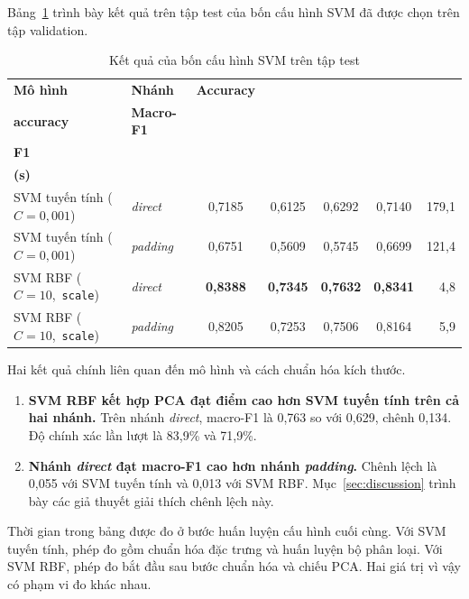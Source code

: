 Bảng~\ref{tab:svm_test} trình bày kết quả trên tập test của bốn cấu hình SVM đã được chọn trên tập validation.

\begin{table}[H]
\centering
\caption{Kết quả của bốn cấu hình SVM trên tập test}
\label{tab:svm_test}
\small
\setlength{\tabcolsep}{4pt}
\begin{tabularx}{\linewidth}{@{}Xlccccr@{}}
\toprule
\textbf{Mô hình} & \textbf{Nhánh} & \textbf{Accuracy} &
\shortstack{\textbf{Balanced}\\\textbf{accuracy}} & \textbf{Macro-F1} &
\shortstack{\textbf{Weighted}\\\textbf{F1}} & \shortstack{\textbf{Thời gian}\\\textbf{(s)}} \\
\midrule
SVM tuyến tính \mbox{($C = 0{,}001$)} & \emph{direct}  & 0,7185 & 0,6125 & 0,6292 & 0,7140 & 179,1 \\
SVM tuyến tính \mbox{($C = 0{,}001$)} & \emph{padding} & 0,6751 & 0,5609 & 0,5745 & 0,6699 & 121,4 \\
SVM RBF \mbox{($C = 10$, \texttt{scale})} & \emph{direct}  & \textbf{0,8388} & \textbf{0,7345} & \textbf{0,7632} & \textbf{0,8341} & 4,8 \\
SVM RBF \mbox{($C = 10$, \texttt{scale})} & \emph{padding} & 0,8205 & 0,7253 & 0,7506 & 0,8164 & 5,9 \\
\bottomrule
\end{tabularx}
\end{table}

Hai kết quả chính liên quan đến mô hình và cách chuẩn hóa kích thước.

\begin{enumerate}
  \item \textbf{SVM RBF kết hợp PCA đạt điểm cao hơn SVM tuyến tính trên cả hai nhánh.} Trên nhánh \emph{direct}, macro-F1 là 0,763 so với 0,629, chênh 0,134. Độ chính xác lần lượt là 83,9\% và 71,9\%.
  \item \textbf{Nhánh \emph{direct} đạt macro-F1 cao hơn nhánh \emph{padding}.} Chênh lệch là 0,055 với SVM tuyến tính và 0,013 với SVM RBF. Mục~\ref{sec:discussion} trình bày các giả thuyết giải thích chênh lệch này.

\end{enumerate}
Thời gian trong bảng được đo ở bước huấn luyện cấu hình cuối cùng. Với SVM tuyến tính, phép đo gồm chuẩn hóa đặc trưng và huấn luyện bộ phân loại. Với SVM RBF, phép đo bắt đầu sau bước chuẩn hóa và chiếu PCA. Hai giá trị vì vậy có phạm vi đo khác nhau.



